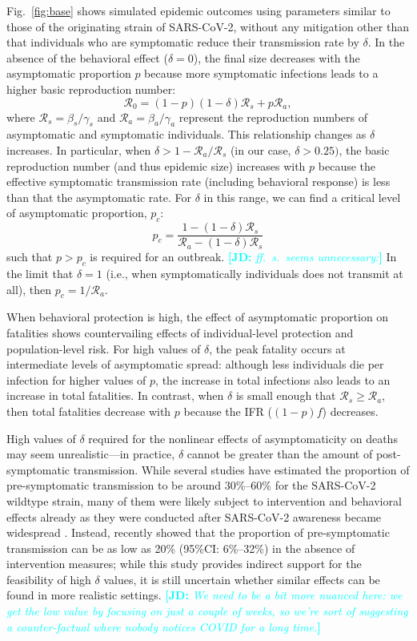 \documentclass[12pt]{article}
\newcommand{\comment}{\showcomment}
\newcommand{\showcomment}[3]{\textcolor{#1}{\textbf{[#2: }\textsl{#3}\textbf{]}}}
\newcommand{\jd}[1]{\comment{cyan}{JD}{#1}}
\newcommand{\fref}[1]{Fig.~\ref{fig:#1}}
\newcommand{\RR}{\ensuremath{{\mathcal R}}\xspace}
\begin{document}
\fref{base} shows simulated epidemic outcomes using parameters similar to those of the originating strain of SARS-CoV-2, without any mitigation other than that individuals who are symptomatic reduce their transmission rate by $\delta$. 
In the absence of the behavioral effect ($\delta=0$), the final size decreases with the asymptomatic proportion $p$ because more symptomatic infections leads to a higher basic reproduction number:
\begin{equation}
\RR_0 = (1-p) (1-\delta) \RR_s + p \RR_a,
\end{equation}
where $\RR_s = \beta_s/\gamma_s$ and $\RR_a = \beta_a/\gamma_a$ represent the reproduction numbers of asymptomatic and symptomatic individuals.
This relationship changes as $\delta$ increases.
In particular, when $\delta > 1-\RR_a/\RR_s$ (in our case, $\delta > 0.25)$, the basic reproduction number (and thus epidemic size) increases with $p$ because the effective symptomatic transmission rate (including behavioral response) is less than that the asymptomatic rate.
For $\delta$ in this range, we can find a critical level of asymptomatic proportion, $p_c$:
\begin{equation}
    p_c = \frac{1 - (1-\delta) \RR_s}{\RR_a - (1-\delta) \RR_s}
\end{equation}
such that $p>p_c$ is required for an outbreak. 
\jd{ff.~s.~seems unnecessary:} In the limit that $\delta=1$ (i.e., when symptomatically individuals does not transmit at all), then $p_c=1/\RR_a$.

When behavioral protection is high, the effect of asymptomatic proportion on fatalities shows countervailing effects of individual-level protection and population-level risk.
For high values of $\delta$, the peak fatality occurs at intermediate levels of asymptomatic spread:
although less individuals die per infection for higher values of $p$, the increase in total infections also leads to an increase in total fatalities.
In contrast, when $\delta$ is small enough that $\RR_s\geq\RR_a$, then total fatalities decrease with $p$ because the IFR ($(1-p)f$) decreases.

High values of $\delta$ required for the nonlinear effects of asymptomaticity on deaths may seem unrealistic---in practice, $\delta$ cannot be greater than the amount of post-symptomatic transmission.
While several studies have estimated the proportion of pre-symptomatic transmission to be around 30\%--60\% for the SARS-CoV-2 wildtype strain, many of them were likely subject to intervention and behavioral effects already as they were conducted after SARS-CoV-2 awareness became widespread \citep{he2020temporal}.
Instead, \cite{sender2021unmitigated} recently showed that the proportion of pre-symptomatic transmission can be as low as 20\% (95\%CI: 6\%--32\%) in the absence of intervention measures;
while this study provides indirect support for the feasibility of high $\delta$ values, it is still uncertain whether similar effects can be found in more realistic settings.
\jd{We need to be a bit more nuanced here: we get the low value by focusing on just a couple of weeks, so we're sort of suggesting a counter-factual where nobody notices COVID for a long time.}
\end{document}
